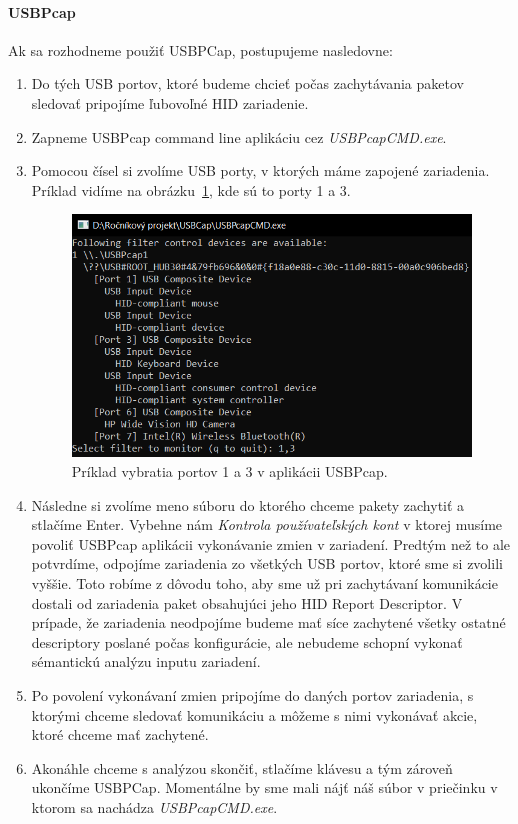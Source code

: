 \paragraph{USBPcap}
\hfill\break
Ak sa rozhodneme použiť USBPCap, postupujeme nasledovne:
\begin{enumerate}
\item Do tých USB portov, ktoré budeme chcieť počas zachytávania paketov sledovať pripojíme ľubovoľné HID zariadenie.
\item Zapneme USBPcap command line aplikáciu cez \textit{USBPcapCMD.exe}.
\item\label{kap6:sec:usbpcap_vyber_portov} Pomocou čísel si zvolíme USB porty, v ktorých máme zapojené zariadenia. Príklad vidíme na obrázku~\ref{obr:kap6:usbpcap_ports}, kde sú to porty 1 a 3.

\begin{figure}[!htb]
	\centering
	\includegraphics[width=12cm]{img/kap06_usbpcap_ports}
	\caption{Príklad vybratia portov 1 a 3 v aplikácii USBPcap.}
	\label{obr:kap6:usbpcap_ports}
\end{figure}

\item Následne si zvolíme meno súboru do ktorého chceme pakety zachytiť a stlačíme Enter. Vybehne nám \textit{Kontrola používateľských kont} v ktorej musíme povoliť USBPcap aplikácii vykonávanie zmien v zariadení. Predtým než to ale potvrdíme, odpojíme zariadenia zo všetkých USB portov, ktoré sme si zvolili vyššie. Toto robíme z dôvodu toho, aby sme už pri zachytávaní komunikácie dostali od zariadenia paket obsahujúci jeho HID Report Descriptor. V prípade, že zariadenia neodpojíme budeme mať síce zachytené všetky ostatné descriptory poslané počas konfigurácie, ale nebudeme schopní vykonať sémantickú analýzu inputu zariadení.
\item Po povolení vykonávaní zmien pripojíme do daných portov zariadenia, s ktorými chceme sledovať komunikáciu a môžeme s nimi vykonávať akcie, ktoré chceme mať zachytené.
\item Akonáhle chceme s analýzou skončiť, stlačíme klávesu  a tým zároveň ukončíme USBPCap. Momentálne by sme mali nájť náš súbor v priečinku v ktorom sa nachádza \textit{USBPcapCMD.exe}.
\end{enumerate}

